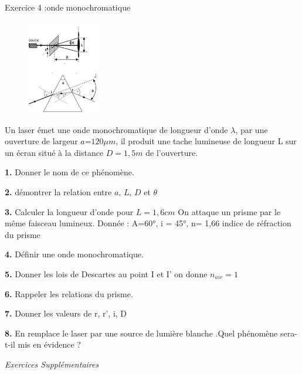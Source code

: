 \documentclass[12pt, french]{article}
\begin{document}
\begin{Box2}{Exercice 4 :onde monochromatique }

\begin{figure}
  \begin{center}
	  \vspace{-0.8cm}
	\includegraphics[width=0.28\textwidth]{./img/ex4.png}
  \end{center}
\end{figure}

Un laser émet une onde monochromatique de longueur d’onde $\lambda$, par
une ouverture de largeur $a$=$120\mu m$, il produit une tache lumineuse de
longueur L sur un écran situé à la distance $D = 1,5m$ de l’ouverture.

\textbf{1. }Donner le nom de ce phénomène.

\textbf{2. }démontrer la relation entre $a$, $L$, $D$ et $\theta$

\textbf{3. }Calculer la longueur d’onde pour $L= 1,6cm$
On attaque un prisme par le même faisceau lumineux.
Donnée : A=60°, i = 45°, n= 1,66 indice de réfraction du prisme

\textbf{4. }Définir une onde monochromatique.

\textbf{5. }Donner les lois de Descartes au point I et I’ on donne $n_{air} =1$

\textbf{6. }Rappeler les relations du prisme.

\textbf{7. }Donner les valeurs de r, r’, i, D

\textbf{8. }En remplace le laser par une source de lumière blanche .Quel phénomène sera-t-il mis en évidence ?

\end{Box2}
\begin{center}
   \Large{ \em{Exercices Supplémentaires}}
\end{center}
\end{document}
